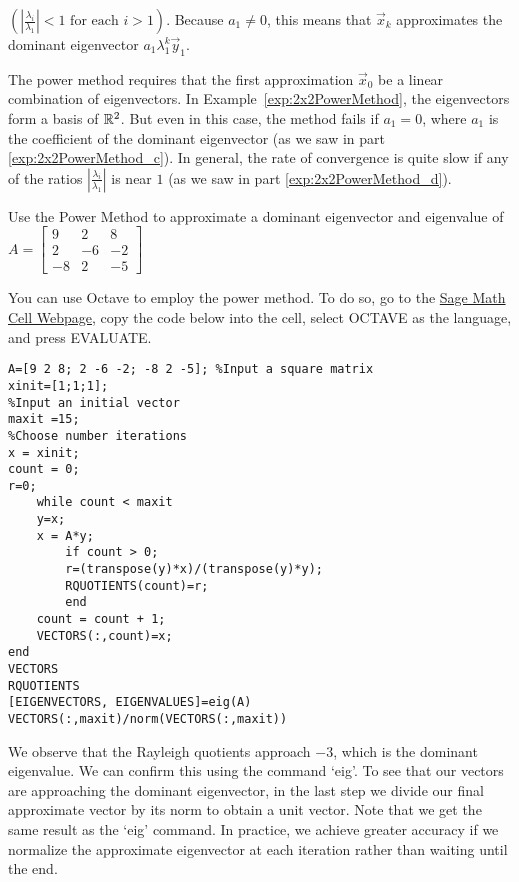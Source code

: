 \documentclass{ximera}
\begin{document}
$\left( \left|\frac{\lambda_{i}}{\lambda_{1}} \right| < 1 \mbox{ for each } i > 1 \right)$. Because $a_{1} \neq 0$, this means that $\vec{x}_{k}$ approximates the dominant eigenvector $a_{1}\lambda_{1}^k\vec{y}_{1}$.


The power method requires that the first approximation $\vec{x}_{0}$ be a linear combination of eigenvectors. In Example~\ref{exp:2x2PowerMethod}, the eigenvectors form a basis of $\mathbb{R}^2$. But even in this case, the method fails if $a_{1} = 0$, where $a_{1}$ is the coefficient of the dominant eigenvector (as we saw in part \ref{exp:2x2PowerMethod_c}). In general, the rate of convergence is quite slow if any of the ratios $\left| \frac{\lambda_{i}}{\lambda_{1}} \right|$ is near $1$ (as we saw in part \ref{exp:2x2PowerMethod_d}). 


\begin{exploration}\label{exp:3x3PowerMethod}
Use the Power Method to approximate a dominant eigenvector and eigenvalue of $A = \left[ \begin{array}{rrr}
9 & 2 & 8 \\
2 & -6 & -2 \\
-8 & 2 & -5
\end{array}\right]$

You can use Octave to employ the power method.  To do so, go to the \href{https://sagecell.sagemath.org/}{Sage Math Cell Webpage}, copy the code below into the cell, select OCTAVE as the language, and press EVALUATE.

\begin{verbatim}
A=[9 2 8; 2 -6 -2; -8 2 -5]; %Input a square matrix
xinit=[1;1;1];
%Input an initial vector
maxit =15;
%Choose number iterations
x = xinit;
count = 0;
r=0;
    while count < maxit
    y=x;
    x = A*y;
        if count > 0; 
        r=(transpose(y)*x)/(transpose(y)*y);
        RQUOTIENTS(count)=r;
        end
    count = count + 1;
    VECTORS(:,count)=x;
end
VECTORS
RQUOTIENTS
[EIGENVECTORS, EIGENVALUES]=eig(A)
VECTORS(:,maxit)/norm(VECTORS(:,maxit))
\end{verbatim}

We observe that the Rayleigh quotients approach $-3$, which is the dominant eigenvalue.  We can confirm this using the command `eig'.  To see that our vectors are approaching the dominant eigenvector, in the last step we divide our final approximate vector by its norm to obtain a unit vector. Note that we get the same result as the `eig' command.  In practice, we achieve greater accuracy if we normalize the approximate eigenvector at each iteration rather than waiting until the end.

\end{exploration}
\end{document}

